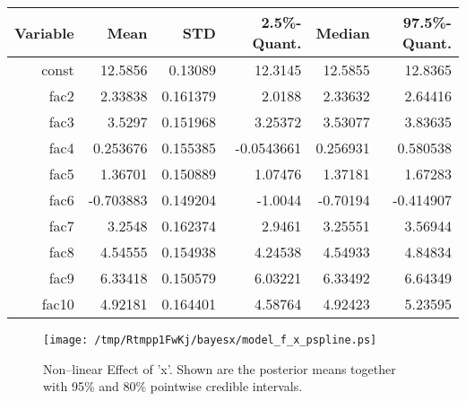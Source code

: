 \documentclass[a4paper, 12pt]{article}
\begin{document}
\\
\\
\begin{tabular}{|r|rrrrr|}
\hline
Variable & Mean & STD & 2.5\%-Quant. & Median & 97.5\%-Quant.\\
\hline
const & 12.5856 & 0.13089 & 12.3145 & 12.5855 & 12.8365\\
fac2 & 2.33838 & 0.161379 & 2.0188 & 2.33632 & 2.64416\\
fac3 & 3.5297 & 0.151968 & 3.25372 & 3.53077 & 3.83635\\
fac4 & 0.253676 & 0.155385 & -0.0543661 & 0.256931 & 0.580538\\
fac5 & 1.36701 & 0.150889 & 1.07476 & 1.37181 & 1.67283\\
fac6 & -0.703883 & 0.149204 & -1.0044 & -0.70194 & -0.414907\\
fac7 & 3.2548 & 0.162374 & 2.9461 & 3.25551 & 3.56944\\
fac8 & 4.54555 & 0.154938 & 4.24538 & 4.54933 & 4.84834\\
fac9 & 6.33418 & 0.150579 & 6.03221 & 6.33492 & 6.64349\\
fac10 & 4.92181 & 0.164401 & 4.58764 & 4.92423 & 5.23595\\
\hline 
\end{tabular}

\newpage
{}

\begin{figure}[h!]
\centering
\texttt{[image: /tmp/Rtmpp1FwKj/bayesx/model\_f\_x\_pspline.ps]}
\caption{Non--linear Effect of 'x'.
Shown are the posterior means together with 95\% and 80\% pointwise credible intervals.}
\end{figure}
\end{document}
